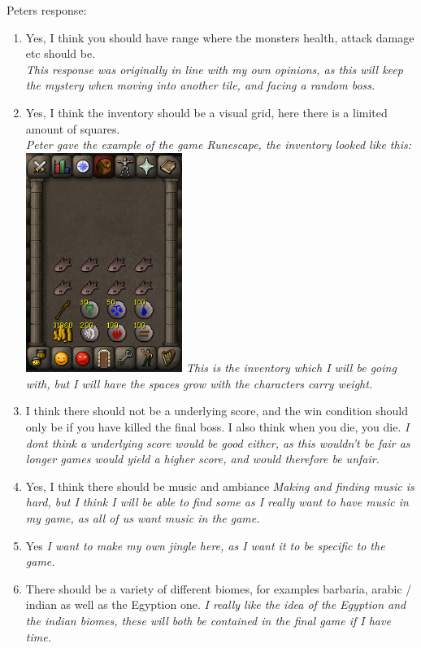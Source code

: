 \documentclass[14pt]{article}
\begin{document}
\centerline{Peters response:}

\begin{enumerate}
	\item{Yes, I think you should have range where the monsters health, attack damage etc should be. \\}
	\em{This response was originally in line with my own opinions, as this will keep the mystery when moving into another tile, and facing a random boss.}
	
	\item{Yes, I think the inventory should be a visual grid, here there is a limited amount of squares. \\}
	\em{Peter gave the example of the game Runescape, the inventory looked like this:}
	\includegraphics[width = 0.4\textwidth]{RuneScape_Image}
	\em{This is the inventory which I will be going with, but I will have the spaces grow with the characters carry weight.}
	
	\item{I think there should not be a underlying score, and the win condition should only be if you have killed the final boss. I also think when you die, you die.}
	\em{I dont think a underlying score would be good either, as this wouldn't be fair as longer games would yield a higher score, and would therefore be unfair.}
	
	\item{Yes, I think there should be music and ambiance}	
	\em{Making and finding music is hard, but I think I will be able to find some as I really want to have music in my game, as all of us want music in the game.}
	
	\item{Yes}
	\em{I want to make my own jingle here, as I want it to be specific to the game.}
	
	\item{There should be a variety of different biomes, for examples barbaria, arabic / indian as well as the Egyption one.}
	\em{I really like the idea of the Egyption and the indian biomes, these will both be contained in the final game if I have time.}
	

\end{enumerate}
\end{document}
